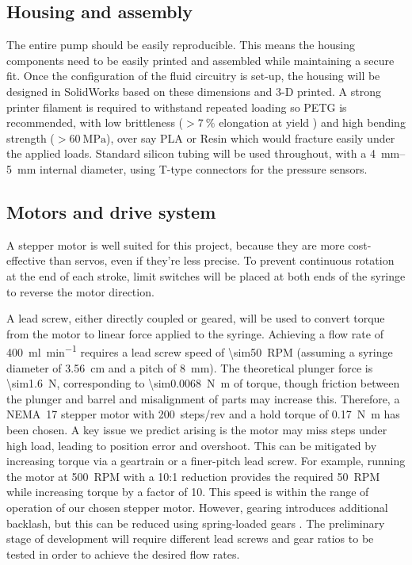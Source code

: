 \documentclass[10pt, a4paper]{article}
\begin{document}
\subsection{Housing and assembly}

The entire pump should be easily reproducible. This means the housing components need to be easily printed and assembled while maintaining a secure fit. Once the configuration of the fluid circuitry is set-up, the housing will be designed in SolidWorks based on these dimensions and 3-D printed. A strong printer filament is required to withstand repeated loading so PETG is recommended, with low brittleness ($>\qty{7}{\percent}$ elongation at yield \cite{PETGHFa}) and high bending strength ($>\qty{60}{\mega\pascal}$), over say PLA or Resin which would fracture easily under the applied loads. Standard silicon tubing will be used throughout, with a \qtyrange{4}{5}{\milli\metre} internal diameter, using T-type connectors for the pressure sensors.

\subsection{Motors and drive system}

A stepper motor is well suited for this project, because they are more cost-effective than servos, even if they're less precise. To prevent continuous rotation at the end of each stroke, limit switches will be placed at both ends of the syringe to reverse the motor direction.

A lead screw, either directly coupled or geared, will be used to convert torque from the motor to linear force applied to the syringe. Achieving a flow rate of \qty{400}{\milli\litre\per\minute} requires a lead screw speed of \qty{\sim50}{RPM} (assuming a syringe diameter of \qty{3.56}{\centi\metre} and a pitch of \qty{8}{\milli\metre}). The theoretical plunger force is \qty{\sim1.6}{\newton}, corresponding to \qty{\sim0.0068}{\newton\metre} of torque, though friction between the plunger and barrel and misalignment of parts may increase this. Therefore, a NEMA~17 stepper motor with 200~steps/rev and a hold torque of \qty{0.17}{\newton\metre} has been chosen.
A key issue we predict arising is the motor may miss steps under high load, leading to position error and overshoot. This can be mitigated by increasing torque via a geartrain or a finer-pitch lead screw. For example, running the motor at \qty{500}{RPM} with a 10:1 reduction provides the required \qty{50}{RPM} while increasing torque by a factor of 10. This speed is within the range of operation of our chosen stepper motor. However, gearing introduces additional backlash, but this can be reduced using spring-loaded gears \cite{NonBacklashSpur}. The preliminary stage of development will require different lead screws and gear ratios to be tested in order to achieve the desired flow rates.
\end{document}

